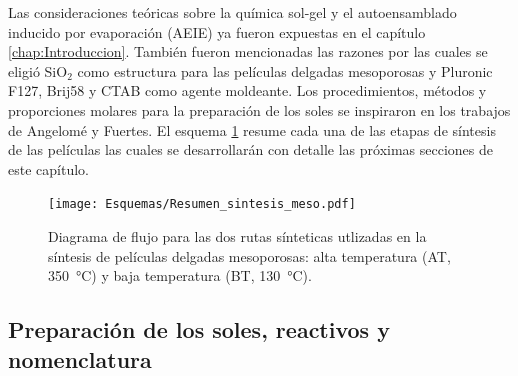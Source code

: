 	 \vspace{-2mm}Las consideraciones teóricas sobre la química sol-gel y el autoensamblado inducido por evaporación (AEIE) ya fueron expuestas en el capítulo \ref{chap:Introduccion}. También fueron mencionadas las razones por las cuales se eligió SiO$_2$ como estructura para las películas delgadas mesoporosas y Pluronic F127, Brij58 y CTAB como agente moldeante. Los procedimientos, métodos y proporciones molares para la preparación de los soles se inspiraron en los trabajos de Angelomé\cite{Angelome2008} y Fuertes\cite{Fuertes2009}. El esquema \ref{esq:peliculas_meso} resume cada una de las etapas de síntesis de las películas las cuales se desarrollarán con detalle las próximas secciones de este capítulo.
	      \vspace*{-0.2cm}
		  \begin{figure}[ht]
			  \begin{center}
			  \texttt{[image: Esquemas/Resumen\_sintesis\_meso.pdf]}
			  \caption[Síntesis de películas delgadas mesoporosas]{Diagrama de flujo para las dos rutas sínteticas utlizadas en la síntesis de películas delgadas mesoporosas: alta temperatura (AT, \SI{350}{\celsius}) y baja temperatura (BT, \SI{130}{\celsius}).}
			  \label{esq:peliculas_meso}
			  \end{center}
			  \end{figure}
			  \vspace*{-0.7cm}

	\subsection{Preparación de los soles, reactivos y nomenclatura}\label{sec:soles}
		
